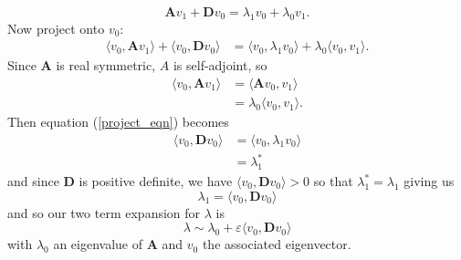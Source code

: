 \documentclass{article}
\begin{document}
\begin{itemize}
\begin{itemize}
        \[\mathbf{A}v_1 + \mathbf{D}v_0 = \lambda_1v_0 + \lambda_0v_1.\]
        Now project onto $v_0$:
        \begin{align}
        \label{project_eqn}
            \langle v_0, \mathbf{A}v_1\rangle + \langle v_0, \mathbf{D}v_0\rangle &= \langle v_0, \lambda_1v_0\rangle + \lambda_0\langle v_0, v_1\rangle.
        \end{align}
        Since $\mathbf{A}$ is real symmetric, $A$ is self-adjoint, so 
        \begin{align*}
            \langle v_0, \mathbf{A}v_1\rangle &= \langle \mathbf{A}v_0, v_1\rangle\\
            &= \lambda_0\langle v_0, v_1\rangle.
        \end{align*}
        Then equation (\ref{project_eqn}) becomes
        \begin{align*}
            \langle v_0, \mathbf{D}v_0 \rangle &= \langle v_0, \lambda_1 v_0\rangle\\
            &= \lambda_1^*
        \end{align*}
        and since $\mathbf{D}$ is positive definite, we have $\langle v_0, \mathbf{D}v_0 \rangle >0$ so that $\lambda_1^* = \lambda_1$ giving us
        \[\lambda_1 = \langle v_0, \mathbf{D}v_0\rangle\]
        and so our two term expansion for $\lambda$ is
        \[\lambda \sim \lambda_0 + \varepsilon\langle v_0, \mathbf{D}v_0\rangle\]
        with $\lambda_0$ an eigenvalue of $\mathbf{A}$ and $v_0$ the associated eigenvector.
        \newline\newline
        


\end{itemize}
\end{itemize}
\end{document}
